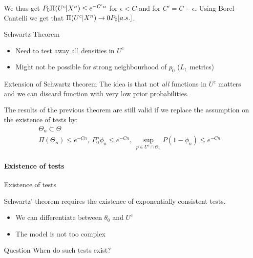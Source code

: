 We thus get $P_0\Pi(U^c|X^n) \leq e^{-C'n}$ for $\epsilon < C$ and for $C' = C - \epsilon$. Using Borel--Cantelli we get that $\Pi(U^c |X^n) \to 0 P_0[a.s.]$. 






{Schwartz Theorem}

\begin{itemize}
\item Need to test away all densities in $U^c$
\item Might not be possible for strong neighbourhood of $p_0$ ($L_1$ metrics)
\end{itemize}
 
\begin{block}{Extension of Schwartz theorem}
The idea is that not \emph{all} functions in $U^c$ matters and we can discard function with very low prior probabilities. 
\end{block}
 
\begin{theorem}
The results of the previous theorem are still valid if we replace the assumption on the existence of tests by: 
\begin{align*}
&\Theta_n \subset \Theta \\ 
&\Pi(\Theta_n) \leq e^{-Cn}, ~ P_0^n \phi_n \leq e^{-Cn}, ~ \sup_{p \in U^c \cap \Theta_n} P(1-\phi_n) \leq e^{-Cn} 
\end{align*}
\end{theorem}




\paragraph{Existence of tests}



{Existence of tests}

Schwartz' theorem requires the existence of exponentially consistent tests.
\begin{itemize}
\item We can differentiate between $\theta_0$ and $U^c$
\item The model is not too complex 
\end{itemize}
 
\begin{block}{Question}
When do such tests exist? 
\end{block}

